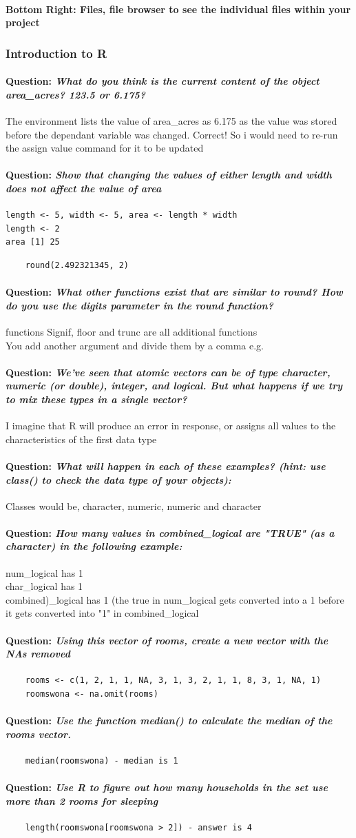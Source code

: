 \documentclass[12pt]{article}
\newcommand{\question}[1]{\paragraph{Question: {\textnormal{\textit{#1}}} ~\\}}
\begin{document}
\paragraph{Bottom Right: Files, file browser to see the individual files within your project}


\subsubsection{Introduction to R}
\question{What do you think is the current content of the object area_acres? 123.5 or 6.175?}
The environment lists the value of area\_acres as 6.175 as the value was stored before the dependant variable was changed. Correct! So i would need to re-run the assign value command for it to be updated

\question{Show that changing the values of either length and width does not affect the value of area}
\begin{verbatim}
length <- 5, width <- 5, area <- length * width
length <- 2
area [1] 25
\end{verbatim}
\begin{verbatim}
    round(2.492321345, 2)
\end{verbatim}

\question{What other functions exist that are similar to round? How do you use the digits parameter in the round function?}
functions Signif, floor and trunc are all additional functions\\
You add another argument and divide them by a comma e.g.

\question{We’ve seen that atomic vectors can be of type character, numeric (or double), integer, and logical. But what happens if we try to mix these types in a single vector?}
I imagine that R will produce an error in response, or assigns all values to the characteristics of the first data type

\question{What will happen in each of these examples? (hint: use class() to check the data type of your objects):}
Classes would be, character, numeric, numeric and character

\question{How many values in combined_logical are "TRUE" (as a character) in the following example:}
num\_logical has 1\\
char\_logical has 1\\
combined)\_logical has 1 (the true in num\_logical gets converted into a 1 before it gets converted into "1" in combined\_logical

\question{Using this vector of rooms, create a new vector with the NAs removed}
\begin{verbatim}
    rooms <- c(1, 2, 1, 1, NA, 3, 1, 3, 2, 1, 1, 8, 3, 1, NA, 1)
    roomswona <- na.omit(rooms)
\end{verbatim}
\question{Use the function median() to calculate the median of the rooms vector.}
\begin{verbatim}
    median(roomswona) - median is 1
\end{verbatim}
\question{Use R to figure out how many households in the set use more than 2 rooms for sleeping}
\begin{verbatim}
    length(roomswona[roomswona > 2]) - answer is 4
\end{verbatim}
\end{document}
